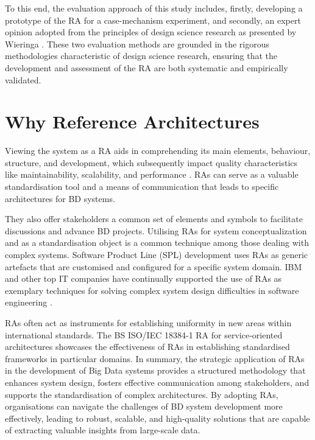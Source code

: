 \documentclass{ieeeaccess}
\begin{document}
To this end, the evaluation approach of this study includes, firstly, developing a prototype of the RA for a case-mechanism experiment, and secondly, an expert opinion adopted from the principles of design science research as presented by Wieringa \cite{wieringa2014design}. These two evaluation methods are grounded in the rigorous methodologies characteristic of design science research, ensuring that the development and assessment of the RA are both systematic and empirically validated.

\section{Why Reference Architectures}

\label{sec:why_reference_architectures}

Viewing the system as a RA aids in comprehending its main elements, behaviour, structure, and development, which subsequently impact quality characteristics like maintainability, scalability, and performance \cite{Cloutier2010}. RAs can serve as a valuable standardisation tool and a means of communication that leads to specific architectures for BD systems. 

They also offer stakeholders a common set of elements and symbols to facilitate discussions and advance BD projects. Utilising RAs for system conceptualization and as a standardisation object is a common technique among those dealing with complex systems. Software Product Line (SPL) development uses RAs as generic artefacts that are customised and configured for a specific system domain. IBM and other top IT companies have continually supported the use of RAs as exemplary techniques for solving complex system design difficulties in software engineering \cite{ataei2022state}. 

RAs often act as instruments for establishing uniformity in new areas within international standards. The BS ISO/IEC 18384-1 RA \cite{Iso18384-1} for service-oriented architectures showcases the effectiveness of RAs in establishing standardised frameworks in particular domains. In summary, the strategic application of RAs in the development of Big Data systems provides a structured methodology that enhances system design, fosters effective communication among stakeholders, and supports the standardisation of complex architectures. By adopting RAs, organisations can navigate the challenges of BD system development more effectively, leading to robust, scalable, and high-quality solutions that are capable of extracting valuable insights from large-scale data.
\end{document}
